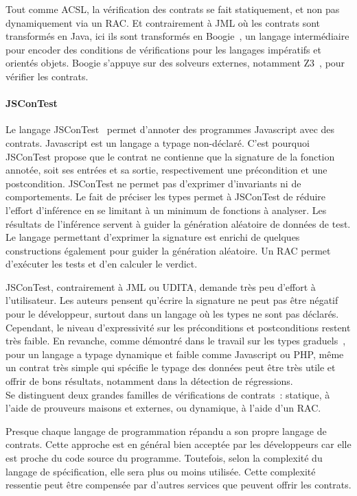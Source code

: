 Tout comme ACSL, la vérification des contrats se fait statiquement, et non pas
dynamiquement via un RAC. Et contrairement à JML où les contrats sont
transformés en Java, ici ils sont transformés en Boogie~,
un langage intermédiaire pour encoder des conditions de vérifications pour les
langages impératifs et orientés objets. Boogie s'appuye sur des solveurs
externes, notamment Z3~, pour vérifier les contrats.

\paragraph{JSConTest} Le langage JSConTest~ permet d'annoter
des programmes Javascript avec des contrats. Javascript est un langage a typage
non-déclaré.  C'est pourquoi JSConTest propose que le contrat ne contienne que
la signature de la fonction annotée, soit ses entrées et sa sortie,
respectivement une précondition et une postcondition. JSConTest ne permet pas
d'exprimer d'invariants ni de comportements. Le fait de préciser les types
permet à JSConTest de réduire l'effort d'inférence en se limitant à un minimum
de fonctions à analyser. Les résultats de l'inférence servent à guider la
génération aléatoire de données de test. Le langage permettant d'exprimer la
signature est enrichi de quelques constructions également pour guider la
génération aléatoire. Un RAC permet d'exécuter les tests et d'en calculer le
verdict.

JSConTest, contrairement à JML ou UDITA, demande très peu d'effort à
l'utilisateur. Les auteurs pensent qu'écrire la signature ne peut pas être
négatif pour le développeur, surtout dans un langage où les types ne sont pas
déclarés. Cependant, le niveau d'expressivité sur les préconditions et
postconditions restent très faible. En revanche, comme démontré dans le travail
sur les types graduels~, pour un langage a typage dynamique et
faible comme Javascript ou PHP, même un contrat très simple qui spécifie le
typage des données peut être très utile et offrir de bons résultats, notamment
dans la détection de régressions. \\

Se distinguent deux grandes familles de vérifications de contrats~: statique, à
l'aide de prouveurs maisons et externes, ou dynamique, à l'aide d'un RAC.

Presque chaque langage de programmation répandu a son propre langage de
contrats. Cette approche est en général bien acceptée par les développeurs car
elle est proche du code source du programme. Toutefois, selon la complexité du
langage de spécification, elle sera plus ou moins utilisée. Cette complexité
ressentie peut être compensée par d'autres services que peuvent offrir les
contrats.

